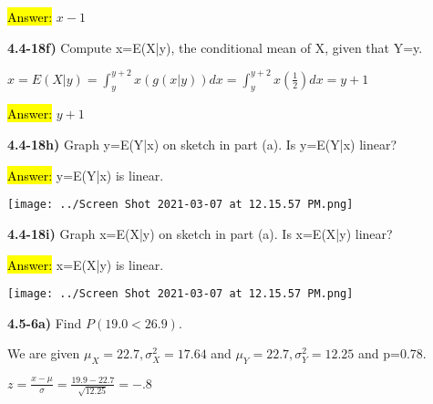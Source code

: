 \documentclass{article}
\begin{document}
\hl{Answer:} $x-1$


\vspace{4mm}

\textbf{ 4.4-18f)} Compute x=E(X|y), the conditional mean of X, given that Y=y.

\vspace{2mm}

$x=E(X|y)=\int_{y}^{y+2} x(g(x | y)) dx=\int_{y}^{y+2} x(\frac{1}{2})dx=y+1$

\vspace{2mm}

\hl{Answer:} $y+1$


\vspace{4mm}

\textbf{ 4.4-18h)} Graph y=E(Y|x) on sketch in part (a). Is y=E(Y|x) linear?

\vspace{2mm}

\hl{Answer:}  y=E(Y|x) is linear.


\vspace{2mm}


\texttt{[image: ../Screen Shot 2021-03-07 at 12.15.57 PM.png]}


\vspace{4mm}


\textbf{ 4.4-18i)} Graph x=E(X|y) on sketch in part (a). Is x=E(X|y) linear?

\vspace{2mm}

\hl{Answer:}  x=E(X|y) is linear. 

\vspace{2mm}

\texttt{[image: ../Screen Shot 2021-03-07 at 12.15.57 PM.png]}












\newpage
\textbf{4.5-6a)} Find $P(19.0 < 26.9)$.

\vspace{2mm}

We are given $\mu_{X}=22.7, \sigma^{2}_{X}=17.64$ and $\mu_{Y}=22.7, \sigma^{2}_{Y}=12.25$ and p=0.78.

\vspace{2mm}

$z=\frac{x-\mu}{\sigma}=\frac{19.9-22.7}{\sqrt{12.25}}=-.8$
\end{document}
